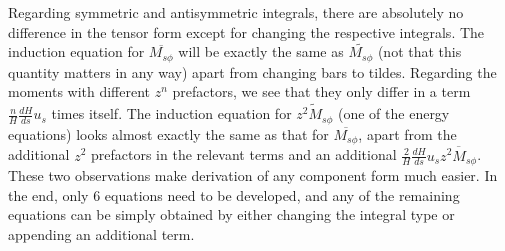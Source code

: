 Regarding symmetric and antisymmetric integrals, there are absolutely no difference in the tensor form except for changing the respective integrals. The induction equation for $\overline{M_{s\phi}}$ will be exactly the same as $\widetilde{M_{s\phi}}$ (not that this quantity matters in any way) apart from changing bars to tildes. 
Regarding the moments with different $z^n$ prefactors, we see that they only differ in a term $\frac{n}{H}\frac{dH}{ds}u_s$ times itself. The induction equation for $\widetilde{z^2 M_{s\phi}}$ (one of the energy equations) looks almost exactly the same as that for $\overline{M_{s\phi}}$, apart from the additional $z^2$ prefactors in the relevant terms and an additional $\frac{2}{H}\frac{dH}{ds}u_s \overline{z^2 M_{s\phi}}$.
These two observations make derivation of any component form much easier. In the end, only 6 equations need to be developed, and any of the remaining equations can be simply obtained by either changing the integral type or appending an additional term.

